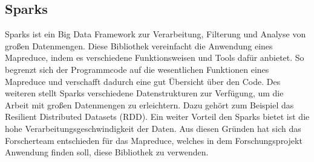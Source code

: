 	
	\subsection{Sparks}
	
	Sparks ist ein Big Data Framework zur Verarbeitung, Filterung und Analyse von großen Datenmengen. Diese Bibliothek vereinfacht die Anwendung eines 
	Mapreduce, indem es verschiedene Funktionsweisen und Tools dafür anbietet. So begrenzt sich der Programmcode auf die wesentlichen Funktionen eines 
	Mapreduce und verschafft dadurch eine gut Übersicht über den Code. Des weiteren stellt Sparks verschiedene Datenstrukturen zur Verfügung, um die Arbeit mit 
	großen Datenmengen zu erleichtern. Dazu gehört zum Beispiel das Resilient Distributed Datasets (RDD). Ein weiter Vorteil den Sparks bietet ist die hohe 
	Verarbeitungsgeschwindigkeit der Daten.
	Aus diesen Gründen hat sich das Forscherteam entschieden für das Mapreduce, welches in dem Forschungsprojekt Anwendung finden soll, diese Bibliothek zu 
	verwenden.     
	

	
